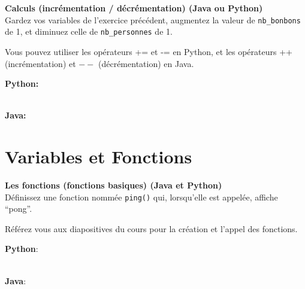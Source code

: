  \begin{Exercice}[5 minutes] \textbf{Calculs (incrémentation / décrémentation) (Java ou Python)}\\
    Gardez vos variables de l'exercice précédent, augmentez la valeur de \texttt{nb\_bonbons} de 1, et diminuez celle de \texttt{nb\_personnes} de 1.  \\
    
     \begin{conseil}
           Vous pouvez utiliser les opérateurs += et -= en Python, et les opérateurs ++ (incrémentation) et $--$ (décrémentation) en Java.
         
     \end{conseil}
     \begin{solution}
     
     \textbf{Python:}
     
     
     \textbf{\\Java:}
     
            
     \end{solution}   
 \end{Exercice}

\section{Variables et Fonctions}
\begin{Exercice}[5 minutes] \textbf{Les fonctions (fonctions basiques) (Java \textbf{et} Python)}\\
    Définissez une fonction nommée \lstinline{ping()} qui, lorsqu'elle est appelée, affiche ``pong''. \\
     
      \begin{conseil}
        Référez vous aux diapositives du cours pour la création et l'appel des fonctions.    
      \end{conseil}
      \begin{solution}
      
          \textbf{Python}:
            
          
          \textbf{\\Java}:
            
             
      \end{solution}   
  \end{Exercice}
  
